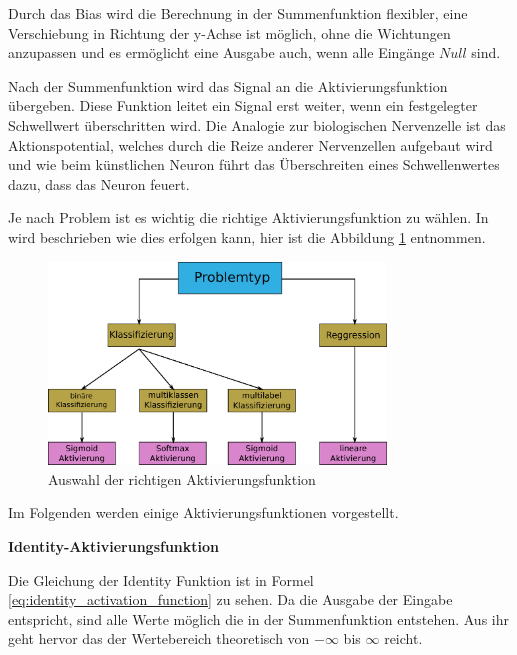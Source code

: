 Durch das Bias wird die Berechnung in der Summenfunktion flexibler, eine Verschiebung in Richtung der y-Achse ist möglich, ohne die Wichtungen anzupassen und es ermöglicht eine Ausgabe auch, wenn alle Eingänge $Null$ sind.\vspace{0.2cm}

Nach der Summenfunktion wird das Signal an die Aktivierungsfunktion übergeben. Diese Funktion leitet ein Signal erst weiter, wenn ein festgelegter Schwellwert überschritten wird. Die Analogie zur biologischen Nervenzelle ist das Aktionspotential, welches durch die Reize anderer Nervenzellen aufgebaut wird und wie beim künstlichen Neuron führt das Überschreiten eines Schwellenwertes dazu, dass das Neuron \glqq feuert\grqq. \vspace{0.2cm}


Je nach Problem ist es wichtig die richtige Aktivierungsfunktion zu wählen. In \cite{brownlee-2021} wird beschrieben wie dies erfolgen kann, hier ist die Abbildung \ref{img:selection_activation_function} entnommen.

\begin{figure}[!ht]
	\includegraphics[width=0.8\textwidth]{content/chapter_basics/images/activation_select.eps}
	\centering
	\caption{Auswahl der richtigen Aktivierungsfunktion}
	\label{img:selection_activation_function}
\end{figure}

Im Folgenden werden einige Aktivierungsfunktionen vorgestellt.\vspace{0.2cm}

%
\textbf{Identity-Aktivierungsfunktion}\vspace{0.2cm}

Die Gleichung der Identity Funktion ist in Formel \ref{eq:identity_activation_function} zu sehen. Da die Ausgabe der Eingabe entspricht, sind alle Werte möglich die in der Summenfunktion entstehen. Aus ihr geht hervor das der Wertebereich theoretisch von $-\infty$ bis $\infty$ reicht.\vspace{0.2cm}

